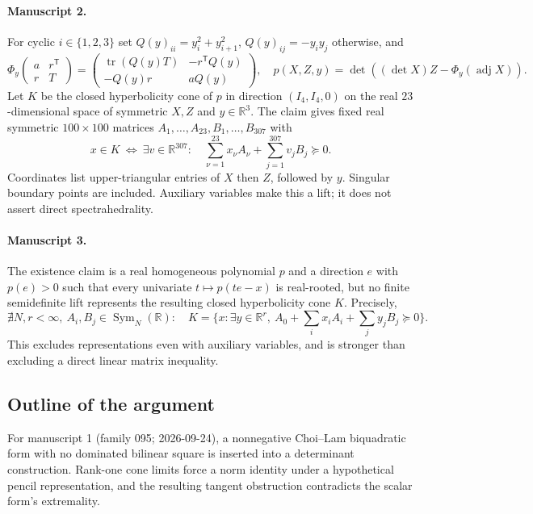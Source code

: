 \documentclass[11pt]{article}
\begin{document}
\paragraph{Manuscript 2.}
For cyclic $i\in\{1,2,3\}$ set $Q(y)_{ii}=y_i^2+y_{i+1}^2$, $Q(y)_{ij}=-y_i y_j$ otherwise, and
\[
 \Phi_y\begin{pmatrix}a&r^{\mathsf T}\\r&T\end{pmatrix}
 =\begin{pmatrix}\operatorname{tr}(Q(y)T)&-r^{\mathsf T}Q(y)\\-Q(y)r&aQ(y)\end{pmatrix},
 \quad p(X,Z,y)=\det((\det X)Z-\Phi_y(\operatorname{adj}X)).
\]
Let $K$ be the closed hyperbolicity cone of $p$ in direction $(I_4,I_4,0)$ on the real $23$-dimensional space of symmetric $X,Z$ and $y\in\mathbb R^3$. The claim gives fixed real symmetric $100\times100$ matrices $A_1,\ldots,A_{23},B_1,\ldots,B_{307}$ with
\[
 x\in K\ \Longleftrightarrow\ \exists v\in\mathbb R^{307}:\quad
 \sum_{\nu=1}^{23}x_{\nu} A_{\nu}+\sum_{j=1}^{307}v_jB_j\succeq0.
\]
Coordinates list upper-triangular entries of $X$ then $Z$, followed by $y$. Singular boundary points are included. Auxiliary variables make this a lift; it does not assert direct spectrahedrality.

\paragraph{Manuscript 3.}
The existence claim is a real homogeneous polynomial $p$ and a direction $e$ with $p(e)>0$ such that every univariate $t\mapsto p(te-x)$ is real-rooted, but no finite semidefinite lift represents the resulting closed hyperbolicity cone $K$. Precisely,
\[
 \nexists N,r<\infty,\ A_i,B_j\in\operatorname{Sym}_N(\mathbb R):\quad
 K=\{x:\exists y\in\mathbb R^r,\ A_0+\sum_ix_iA_i+\sum_jy_jB_j\succeq0\}.
\]
This excludes representations even with auxiliary variables, and is stronger than excluding a direct linear matrix inequality.

\subsection{Outline of the argument}
For manuscript 1 (family 095; 2026-09-24), a nonnegative Choi--Lam biquadratic form with no dominated bilinear square is inserted into a determinant construction. Rank-one cone limits force a norm identity under a hypothetical pencil representation, and the resulting tangent obstruction contradicts the scalar form's extremality.
\end{document}
